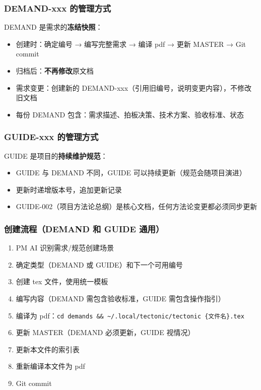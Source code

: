 \documentclass[11pt,a4paper]{article}
\begin{document}
\subsubsection{DEMAND-xxx 的管理方式}

DEMAND 是需求的\textbf{冻结快照}：

\begin{itemize}[nosep]
  \item 创建时：确定编号 → 编写完整需求 → 编译 pdf → 更新 MASTER → Git commit
  \item 归档后：\textbf{不再修改}原文档
  \item 需求变更：创建新的 DEMAND-xxx（引用旧编号，说明变更内容），不修改旧文档
  \item 每份 DEMAND 包含：需求描述、拍板决策、技术方案、验收标准、状态
\end{itemize}

\subsubsection{GUIDE-xxx 的管理方式}

GUIDE 是项目的\textbf{持续维护规范}：

\begin{itemize}[nosep]
  \item GUIDE 与 DEMAND 不同，GUIDE 可以持续更新（规范会随项目演进）
  \item 更新时递增版本号，追加更新记录
  \item GUIDE-002（项目方法论总纲）是核心文档，任何方法论变更都必须同步更新
\end{itemize}

\subsubsection{创建流程（DEMAND 和 GUIDE 通用）}

\begin{enumerate}[nosep]
  \item PM AI 识别需求/规范创建场景
  \item 确定类型（DEMAND 或 GUIDE）和下一个可用编号
  \item 创建 tex 文件，使用统一模板
  \item 编写内容（DEMAND 需包含验收标准，GUIDE 需包含操作指引）
  \item 编译为 pdf：\texttt{cd demands \&\& \textasciitilde/.local/tectonic/tectonic \{文件名\}.tex}
  \item 更新 MASTER（DEMAND 必须更新，GUIDE 视情况）
  \item 更新本文件的索引表
  \item 重新编译本文件为 pdf
  \item Git commit
\end{enumerate}
\end{document}
